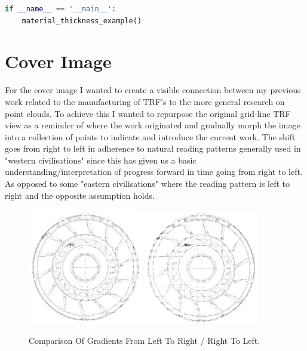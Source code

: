 \documentclass[%
]{USN-MSc}
\begin{document}
\begin{lstlisting}[language=Python, caption=Material thickness example use of Methods, label={lst:viz}]
if __name__ == '__main__':
    material_thickness_example()

\end{lstlisting}

\clearpage

\section{Cover Image}
\label{sc:Cover Image}
For the cover image I wanted to create a visible connection between my previous work related to the manufacturing of TRF's to the more general research on point clouds. To achieve this I wanted to repurpose the original grid-line TRF view as a reminder of where the work originated and gradually morph the image into a collection of points to indicate and introduce the current work. The shift goes from right to left in adherence to natural reading patterns generally used in "western civilisations" since this has given us a basic understanding/interpretation of progress forward in time going from right to left. As opposed to some "eastern civilisations" where the reading pattern is left to right and the opposite assumption holds.

\begin{figure}[H]
  \centering
  \includegraphics[width=0.45\textwidth]{fig/TRF Points 2.png}
  \includegraphics[width=0.44\textwidth]{fig/Points Inverted.png}
  \caption{Comparison Of Gradients From Left To Right / Right To Left.}
  \label{fig:Comparison of Gradients}
\end{figure}
\end{document}
